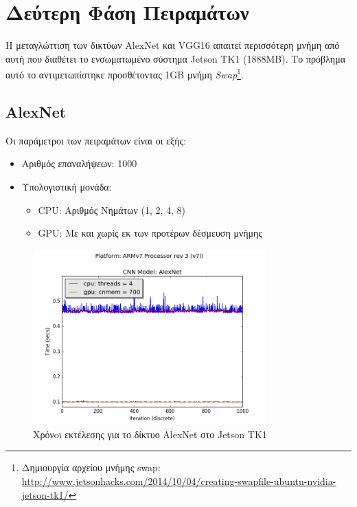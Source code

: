 \section{Δεύτερη Φάση Πειραμάτων}
\label{sec:experiments_phase2}

Η μεταγλώττιση των δικτύων AlexNet και VGG16 απαιτεί περισσότερη
μνήμη από αυτή που διαθέτει το ενσωματωμένο σύστημα Jetson TK1 (1888MB).
Το πρόβλημα αυτό το αντιμετωπίστηκε προσθέτοντας 1GB μνήμη
\emph{Swap}\footnote{Δημιουργία αρχείου μνήμης swap: \url{http://www.jetsonhacks.com/2014/10/04/creating-swapfile-ubuntu-nvidia-jetson-tk1/}}.


\subsection{AlexNet}

Οι παράμετροι των πειραμάτων είναι οι εξής:
\begin{itemize}
  \item{Αριθμός επαναλήψεων: 1000}
  \item{Υπολογιστική μονάδα:}
    \begin{itemize}
      \item{CPU: Αριθμός Νημάτων (1, 2, 4, 8)}
      \item{GPU: Με και χωρίς εκ των προτέρων δέσμευση μνήμης}
    \end{itemize}
\end{itemize}

\begin{figure}[H]
  \centering
  \includegraphics[width=0.8\textwidth]{./images/chapter6/benchmark_alexnet_jetson.png}
  \caption[Χρόνoι εκτέλεσης για το δίκτυο AlexNet στο Jetson TK1]{Χρόνoι εκτέλεσης για το δίκτυο AlexNet στο Jetson TK1}
  \label{fig:alexnet_results_jetson}
\end{figure}

